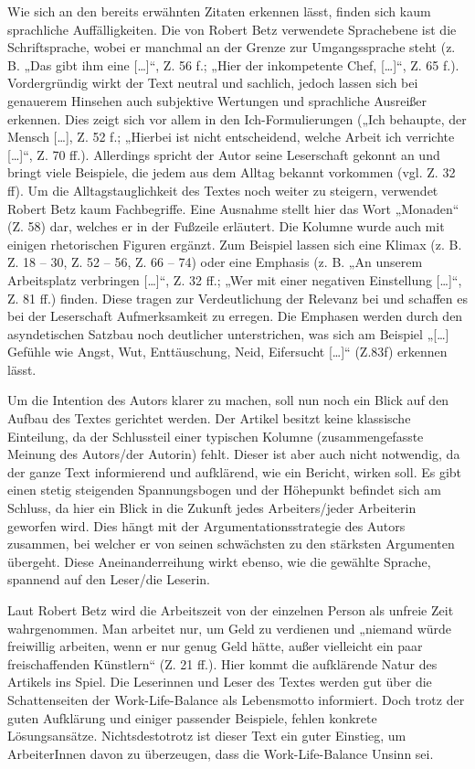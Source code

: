 Wie sich an den bereits erwähnten Zitaten erkennen lässt, finden sich kaum sprachliche Auffälligkeiten. Die von Robert Betz verwendete Sprachebene ist die Schriftsprache, wobei er manchmal an der Grenze zur Umgangssprache steht (z. B. „Das gibt ihm eine […]“, Z. 56 f.; „Hier der inkompetente Chef, […]“, Z. 65 f.). Vordergründig wirkt der Text neutral und sachlich, jedoch lassen sich bei genauerem Hinsehen auch subjektive Wertungen und sprachliche Ausreißer erkennen. Dies zeigt sich vor allem in den Ich-Formulierungen („Ich behaupte, der Mensch […], Z. 52 f.; „Hierbei ist nicht entscheidend, welche Arbeit ich verrichte […]“, Z. 70 ff.). Allerdings spricht der Autor seine Leserschaft gekonnt an und bringt viele Beispiele, die jedem aus dem Alltag bekannt vorkommen (vgl. Z. 32 ff). Um die Alltagstauglichkeit des Textes noch weiter zu steigern, verwendet Robert Betz kaum Fachbegriffe. Eine Ausnahme stellt hier das Wort „Monaden“ (Z. 58) dar, welches er in der Fußzeile erläutert. Die Kolumne wurde auch mit einigen rhetorischen Figuren ergänzt. Zum Beispiel lassen sich eine Klimax (z. B. Z. 18 – 30, Z. 52 – 56, Z. 66 – 74) oder eine Emphasis (z. B. „An unserem Arbeitsplatz verbringen […]“, Z. 32 ff.; „Wer mit einer negativen Einstellung […]“, Z. 81 ff.) finden. Diese tragen zur Verdeutlichung der Relevanz bei und schaffen es bei der Leserschaft Aufmerksamkeit zu erregen. Die Emphasen werden durch den asyndetischen Satzbau noch deutlicher unterstrichen, was sich am Beispiel „[…] Gefühle wie Angst, Wut, Enttäuschung, Neid, Eifersucht […]“ (Z.83f) erkennen lässt.  

Um die Intention des Autors klarer zu machen, soll nun noch ein Blick auf den Aufbau des Textes gerichtet werden. Der Artikel besitzt keine klassische Einteilung, da der Schlussteil einer typischen Kolumne (zusammengefasste Meinung des Autors/der Autorin) fehlt. Dieser ist aber auch nicht notwendig, da der ganze Text informierend und aufklärend, wie ein Bericht, wirken soll. Es gibt einen stetig steigenden Spannungsbogen und der Höhepunkt befindet sich am Schluss, da hier ein Blick in die Zukunft jedes Arbeiters/jeder Arbeiterin geworfen wird. Dies hängt mit der Argumentationsstrategie des Autors zusammen, bei welcher er von seinen schwächsten zu den stärksten Argumenten übergeht. Diese Aneinanderreihung wirkt ebenso, wie die gewählte Sprache, spannend auf den Leser/die Leserin.  

Laut Robert Betz wird die Arbeitszeit von der einzelnen Person als unfreie Zeit wahrgenommen. Man arbeitet nur, um Geld zu verdienen und „niemand würde freiwillig arbeiten, wenn er nur genug Geld hätte, außer vielleicht ein paar freischaffenden Künstlern“ (Z. 21 ff.). Hier kommt die aufklärende Natur des Artikels ins Spiel. Die Leserinnen und Leser des Textes werden gut über die Schattenseiten der Work-Life-Balance als Lebensmotto informiert. Doch trotz der guten Aufklärung und einiger passender Beispiele, fehlen konkrete Lösungsansätze. Nichtsdestotrotz ist dieser Text ein guter Einstieg, um ArbeiterInnen davon zu überzeugen, dass die Work-Life-Balance Unsinn sei.  

